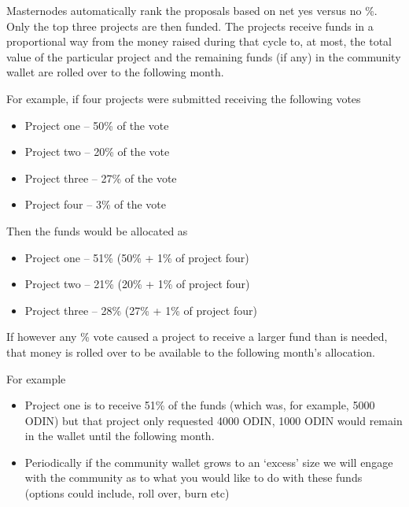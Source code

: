 Masternodes automatically rank the proposals based on net yes versus no \%. Only the top three projects are then funded. The projects receive funds in a proportional way from the money raised during that cycle to, at most, the total value of the particular project and the remaining funds (if any) in the community wallet are rolled over to the following month.

For example, if four projects were submitted receiving the following votes
\begin{itemize}
   \item Project one -- 50\% of the vote
   \item Project two -- 20\% of the vote
   \item Project three -- 27\% of the vote
   \item Project four -- 3\% of the vote
\end{itemize}
Then the funds would be allocated as
\begin{itemize}
   \item Project one -- 51\% (50\% + 1\% of project four)
   \item Project two -- 21\% (20\% + 1\% of project four)
   \item Project three -- 28\% (27\% + 1\% of project four)
\end{itemize}

If however any \% vote caused a project to receive a larger fund than is needed, that money is rolled over to be available to the following month's allocation.

For example
\begin{itemize}
   \item Project one is to receive 51\% of the funds (which was, for example, 5000 ODIN) but that project only requested 4000 ODIN, 1000 ODIN would remain in the wallet until the following month.
   \item Periodically if the community wallet grows to an `excess' size we will engage with the community as to what you would like to do with these funds (options could include, roll over, burn etc)
\end{itemize}
